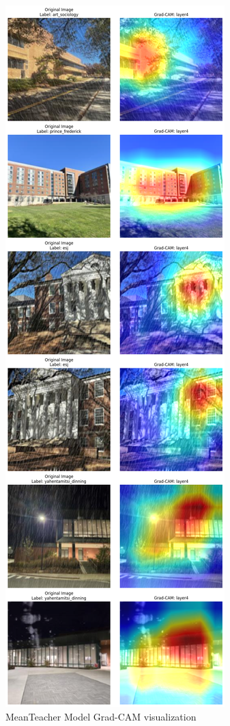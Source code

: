 \documentclass{article}
\begin{document}
\begin{figure}[H]
    \centering
    \includegraphics[trim={0 38cm 0 12.5cm},clip,width=0.6\linewidth]{meanteacher.png}
    \caption{MeanTeacher Model Grad-CAM visualization}
    \label{fig:meanteacher_results}
\end{figure}
\end{document}
